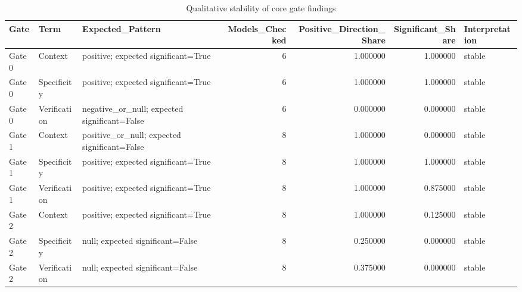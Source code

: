 \begin{table}
\caption{Qualitative stability of core gate findings}
\label{tab:robustness-core-stability}
\begin{tabular}{lllrrrl}
\toprule
Gate & Term & Expected\_Pattern & Models\_Checked & Positive\_Direction\_Share & Significant\_Share & Interpretation \\
\midrule
Gate 0 & Context & positive; expected significant=True & 6 & 1.000000 & 1.000000 & stable \\
Gate 0 & Specificity & positive; expected significant=True & 6 & 1.000000 & 1.000000 & stable \\
Gate 0 & Verification & negative\_or\_null; expected significant=False & 6 & 0.000000 & 0.000000 & stable \\
Gate 1 & Context & positive\_or\_null; expected significant=False & 8 & 1.000000 & 0.000000 & stable \\
Gate 1 & Specificity & positive; expected significant=True & 8 & 1.000000 & 1.000000 & stable \\
Gate 1 & Verification & positive; expected significant=True & 8 & 1.000000 & 0.875000 & stable \\
Gate 2 & Context & positive; expected significant=True & 8 & 1.000000 & 0.125000 & stable \\
Gate 2 & Specificity & null; expected significant=False & 8 & 0.250000 & 0.000000 & stable \\
Gate 2 & Verification & null; expected significant=False & 8 & 0.375000 & 0.000000 & stable \\
\bottomrule
\end{tabular}
\end{table}
